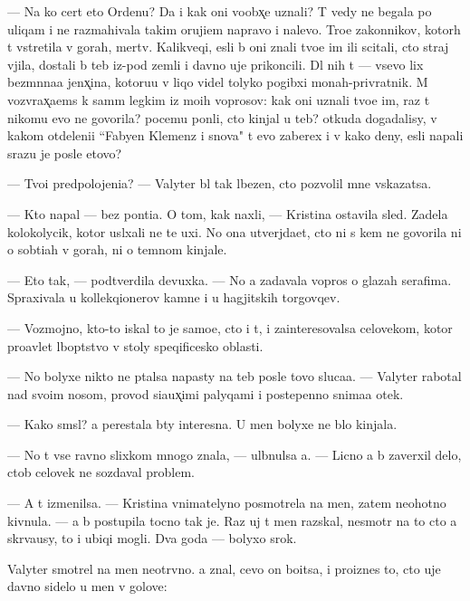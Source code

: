 \documentclass[10pt]{book}
\begin{document}
— Na ko{\y} cert eto Ordenu? Da i kak oni voobx̨e uznali? T{\yi} vedy ne begala po uliqam i ne razmahivala takim oruji{\y}em napravo i nalevo. Tro{\y}e zakonnikov, kotor{\yi}h t{\yi} vstretila v gorah, mertv{\yi}. Kalikveqi, {\y}esli b{\yi} oni znali tvo{\y}e im{\ia} ili scitali, cto straj v{\yi}jila, dostali b{\yi} teb{\ia} iz-pod zemli i davno uje prikoncili. Dl{\ia} nih t{\yi} — vsevo lix bez{\yi}m{\ia}nna{\y}a jenx̨ina, kotoru{\y}u v liqo videl tolyko pogibxi{\y} monah-privratnik. M{\yi} vozvrax̨a{\y}ems{\ia} k sam{\yi}m legkim iz mo{\y}ih voprosov: kak oni uznali tvo{\y}e im{\ia}, raz t{\yi} nikomu {\y}evo ne govorila? pocemu pon{\ia}li, cto kinjal u teb{\ia}? otkuda dogadalisy, v kakom otdeleni{\y}i ``Fabyen Klemenz i s{\yi}nov{\y}a" t{\yi} {\y}evo zaberex i v kako{\y} deny, {\y}esli napali srazu je posle etovo?

— Tvo{\y}i predpolojeni{\y}a? — Valyter b{\yi}l tak l{\iu}bezen, cto pozvolil mne v{\yi}skazatsa.

— Kto napal — bez pon{\ia}ti{\y}a. O tom, kak naxli, — Kristina ostavila sled{\yi}. Zadela kolokolycik, kotor{\yi}{\y} usl{\yi}xali ne te uxi. No ona utverjda{\y}et, cto ni s kem ne govorila ni o sob{\yi}ti{\y}ah v gorah, ni o temnom kinjale.

— Eto tak, — podtverdila devuxka. — No {\y}a zadavala vopros{\yi} o glazah serafima. Spraxivala u kollekqionerov kamne{\y} i u hagjitskih torgovqev.

— Vozmojno, kto-to iskal to je samo{\y}e, cto i t{\yi}, i za{\y}interesovalsa celovekom, kotor{\yi}{\y} pro{\y}avl{\ia}{\y}et l{\iu}bop{\yi}tstvo v stoly speqificesko{\y} oblasti.

— No bolyxe nikto ne p{\yi}talsa napasty na teb{\ia} posle tovo sluca{\y}a. — Valyter rabotal nad svo{\y}im nosom, provod{\ia} si{\y}a{\y}ux̨imi palyqami i postepenno snima{\y}a otek.

— Kako{\y} sm{\yi}sl? {\Y}a perestala b{\yi}ty interesna. U men{\ia} bolyxe ne b{\yi}lo kinjala.

— No t{\yi} vse ravno slixkom mnogo znala, — ul{\yi}bnulsa {\y}a. — Licno {\y}a b{\yi} zaverxil delo, ctob{\yi} celovek ne sozdaval problem{\yi}.

— A t{\yi} izmenilsa. — Kristina vnimatelyno posmotrela na men{\ia}, zatem neohotno kivnula. — {\Y}a b{\yi} postupila tocno tak je. Raz uj t{\yi} men{\ia} raz{\yi}skal, nesmotr{\ia} na to cto {\y}a skr{\yi}va{\y}usy, to i ubi{\y}qi mogli. Dva goda — bolyxo{\y} srok.

Valyter smotrel na men{\ia} neotr{\yi}vno. {\Y}a znal, cevo on bo{\y}itsa, i pro{\y}iznes to, cto uje davno sidelo u men{\ia} v golove:
\end{document}
